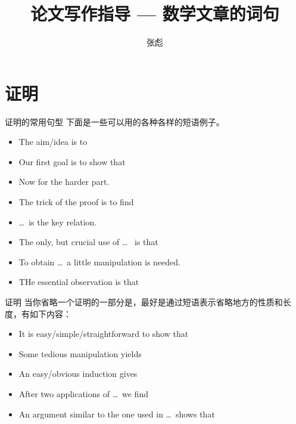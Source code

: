 \documentclass{ctexbeamer}
\begin{document}
\title[]{论文写作指导 --- 数学文章的词句}
\author[]{{\large 张彪} }

\date{}






\begin{frame}
\maketitle
\end{frame}


\begin{frame}
	\tableofcontents	
\end{frame}



\section{证明}



\begin{frame}{证明的常用句型}
	下面是一些可以用的各种各样的短语例子。
	\begin{itemize}
		\item The aim/idea is to 
		\item Our first goal is to show that 
		\item Now for the harder part.
		\item The trick of the proof is to find
		\item \dots ~is the key relation.
		\item The only, but crucial use of  \dots~ is that 
		\item To obtain \dots ~a little manipulation is needed.
		\item THe essential observation is that 
	\end{itemize}
\end{frame}


\begin{frame}{证明}
	当你省略一个证明的一部分是，最好是通过短语表示省略地方的性质和长度，有如下内容：
	\begin{itemize}
		\item It is easy/simple/straightforward to show that 
		\item Some tedious manipulation yields
		\item An easy/obvious induction gives 
		\item After two applications of  \dots ~we find
		\item An argument similar to the one used in  \dots ~shows that 
	\end{itemize}
\end{frame}
\end{document}

